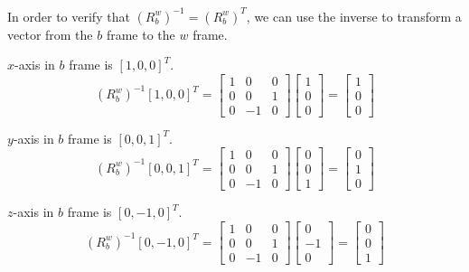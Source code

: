\documentclass[answers]{exam}
\begin{document}
\begin{questions}
\begin{parts}
\begin{solution}
In order to verify that $(R^w_b)^{-1} = (R^w_b)^T$, we can use the inverse to
transform a vector from the $b$ frame to the $w$ frame.

$x$-axis in $b$ frame is $[1, 0, 0]^T$.
\begin{equation*}
(R^w_b)^{-1} [1, 0, 0]^T = \begin{bmatrix}
    1 & 0  & 0 \\
    0 & 0  & 1 \\
    0 & -1 & 0
\end{bmatrix}
\begin{bmatrix}
    1 \\
    0 \\
    0
\end{bmatrix}
= \begin{bmatrix}
1 \\
0 \\
0
\end{bmatrix}
\end{equation*}

$y$-axis in $b$ frame is $[0, 0, 1]^T$.
\begin{equation*}
(R^w_b)^{-1} [0, 0, 1]^T = \begin{bmatrix}
    1 & 0  & 0 \\
    0 & 0  & 1 \\
    0 & -1 & 0
\end{bmatrix}
\begin{bmatrix}
    0 \\
    0 \\
    1
\end{bmatrix}
= \begin{bmatrix}
0 \\
1 \\
0
\end{bmatrix}
\end{equation*}

$z$-axis in $b$ frame is $[0, -1, 0]^T$.
\begin{equation*}
(R^w_b)^{-1} [0, -1, 0]^T = \begin{bmatrix}
    1 & 0  & 0 \\
    0 & 0  & 1 \\
    0 & -1 & 0
\end{bmatrix}
\begin{bmatrix}
    0  \\
    -1 \\
    0
\end{bmatrix}
= \begin{bmatrix}
0 \\
0 \\
1
\end{bmatrix}
\end{equation*}


\end{solution}
\end{parts}
\end{questions}
\end{document}
